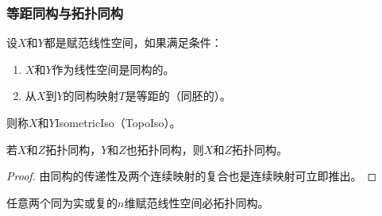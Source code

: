\subsubsection{等距同构与拓扑同构}
\begin{definition}
	设$X$和$Y$都是赋范线性空间，如果满足条件：
	\begin{enumerate}
		\item $X$和$Y$作为线性空间是同构的。
		\item 从$X$到$Y$的同构映射$T$是等距的（同胚的）。
	\end{enumerate}
	则称$X$和$Y$\gls{IsometricIso}（\gls{TopoIso}）。
\end{definition}
\begin{lemma}\label{lem:trans of TopoIso}
	若$X$和$Z$拓扑同构，$Y$和$Z$也拓扑同构，则$X$和$Z$拓扑同构。
\end{lemma}
\begin{proof}
	由同构的传递性及两个连续映射的复合也是连续映射可立即推出。
\end{proof}
\begin{theorem}\label{theo:TopoIso of n dimensional normed linear space}
	任意两个同为实或复的$n$维赋范线性空间必拓扑同构。
\end{theorem}
